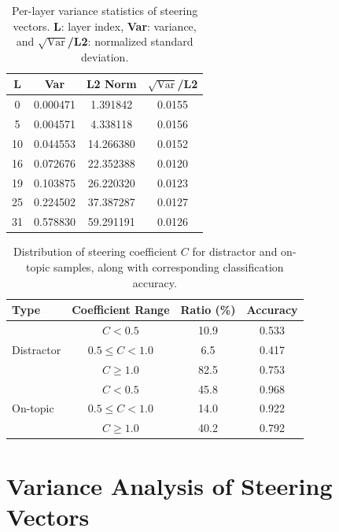 \documentclass[11pt]{article}
\begin{document}
\begin{table}[ht]
\centering
\footnotesize
\begin{tabular}{c c c c}
\toprule
\textbf{L} & \textbf{Var} & \textbf{L2 Norm} & \textbf{$\sqrt{\text{Var}}$/L2} \\
\midrule
0  & 0.000471 & 1.391842  & 0.0155 \\
5  & 0.004571 & 4.338118  & 0.0156 \\
10 & 0.044553 & 14.266380 & 0.0152 \\
16 & 0.072676 & 22.352388 & 0.0120 \\
19 & 0.103875 & 26.220320 & 0.0123 \\
25 & 0.224502 & 37.387287 & 0.0127 \\
31 & 0.578830 & 59.291191 & 0.0126 \\
\bottomrule
\end{tabular}
\vspace{0.5em}
\caption{Per-layer variance statistics of steering vectors. \textbf{L}: layer index, \textbf{Var}: variance, and \textbf{$\sqrt{\text{Var}}$/L2}: normalized standard deviation.}
\label{tab:variance_steering_vectors}
\end{table}


\begin{table}[ht]
\centering
\footnotesize
\begin{tabular}{lccc}
\toprule
Type & Coefficient Range & Ratio (\%) & Accuracy \\
\midrule
\multirow{3}{*}{Distractor}
    & $ C < 0.5$            & 10.9 & 0.533 \\
    & $0.5 \leq C < 1.0$ & 6.5  & 0.417 \\
    & $ C \geq 1.0$         & 82.5 & 0.753 \\
\midrule
\multirow{3}{*}{On-topic}
    & $ C < 0.5$            & 45.8 & 0.968 \\
    & $0.5 \leq C < 1.0$ & 14.0 & 0.922 \\
    & $C \geq 1.0$         & 40.2 & 0.792 \\
\bottomrule
\end{tabular}
\caption{Distribution of steering coefficient $C$ for distractor and on-topic samples, along with corresponding classification accuracy.}
\label{tab:coeff_combined}
\end{table}




\section{Variance Analysis of Steering Vectors}
\label{sec:variance_analysis}
\end{document}
